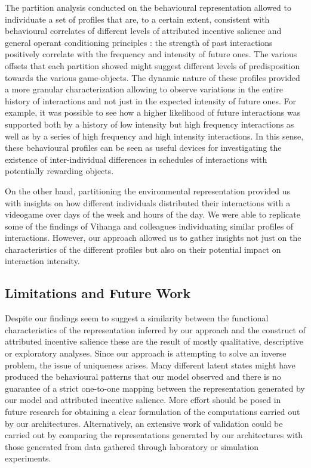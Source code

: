 The partition analysis conducted on the behavioural representation allowed to individuate a set of profiles that are, to a certain extent, consistent with behavioural correlates of different levels of attributed incentive salience \cite{berridge2004motivation} and general operant conditioning principles \cite{thorndike1927law, skinner1953science, nevin2000behavioral}: the strength of past interactions positively correlate with the frequency and intensity of future ones. The various offsets that each partition showed might suggest different levels of predisposition towards the various game-objects. The dynamic nature of these profiles provided a more granular characterization allowing to observe variations in the entire history of interactions and not just in the expected intensity of future ones. For example, it was possible to see how a higher likelihood of future interactions was supported both by a history of low intensity but high frequency interactions as well as by a series of high frequency and high intensity interactions. In this sense, these behavioural profiles can be seen as useful devices for investigating the existence of inter-individual differences in schedules of interactions with potentially rewarding objects. 

On the other hand, partitioning the environmental representation provided us with insights on how different individuals distributed their interactions with a videogame over days of the week and hours of the day. We were able to replicate some of the findings of Vihanga and colleagues \cite{vihanga2019weekly, wannigamage2021player} individuating similar profiles of interactions. However, our approach allowed us to gather insights not just on the characteristics of the different profiles but also on their potential impact on interaction intensity.

\subsection{Limitations and Future Work}
Despite our findings seem to suggest a similarity between the functional characteristics of the representation inferred by our approach and the construct of attributed incentive salience these are the result of mostly qualitative, descriptive or exploratory analyses. 
Since our approach is attempting to solve an inverse problem, the issue of uniqueness arises. Many different latent states might have produced the behavioural patterns that our model observed and there is no guarantee of a strict one-to-one mapping between the representation generated by our model and attributed incentive salience.  More effort should be posed in future research for obtaining a clear formulation of the computations carried out by our architectures. Alternatively, an extensive work of validation could be carried out by comparing the representations generated by our architectures with those generated from data gathered through laboratory or simulation experiments. 

